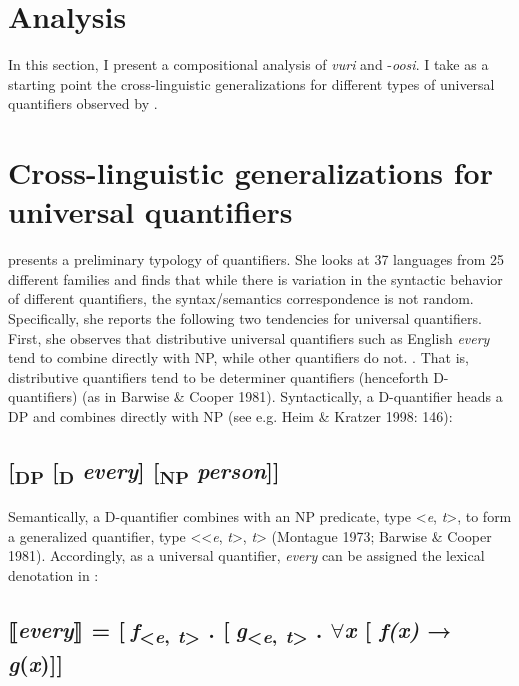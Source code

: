 \documentclass[output=paper]{langsci/langscibook}
\begin{document}
\section{Analysis}

In this section, I present a compositional analysis of \textit{vuri} and -\textit{oosi}. I take as a starting point the cross-linguistic generalizations for different types of universal quantifiers observed by \citet{Matthewson2013}. 

\section{Cross-linguistic generalizations for universal quantifiers}

\citet{Matthewson2013} presents a preliminary typology of quantifiers. She looks at 37 languages from 25 different families and finds that while there is variation in the syntactic behavior of different quantifiers, the syntax/semantics correspondence is not random. Specifically, she reports the following two tendencies for universal quantifiers. First, she observes that distributive universal quantifiers such as English \textit{every} tend to {\textquotedbl}combine directly with NP, while other quantifiers do not.{\textquotedbl} \citep[36]{Matthewson2013}. That is, distributive quantifiers tend to be determiner quantifiers (henceforth D-quantifiers) (as in Barwise \& Cooper 1981). Syntactically, a D-quantifier heads a DP and combines directly with NP (see e.g. Heim \& Kratzer 1998: 146): 

\subsection{      [\textsubscript{DP} [\textsubscript{D} \textit{every}] [\textsubscript{NP} \textit{person}]]}

Semantically, a D-quantifier combines with an NP predicate, type <\textit{e}, \textit{t}>, to form a generalized quantifier, type <<\textit{e}, \textit{t}>, \textit{t}> (Montague 1973; Barwise \& Cooper 1981). Accordingly, as a universal quantifier, \textit{every} can be assigned the lexical denotation in :

\subsection{      ⟦\textit{every}⟧ = [\textit{f}\textsubscript{<}\textit{\textsubscript{e}}\textsubscript{,}\textit{\textsubscript{ t}}\textsubscript{>} . [\textit{g}\textsubscript{<}\textit{\textsubscript{e}}\textsubscript{,}\textit{\textsubscript{ t}}\textsubscript{>} . ${\forall}$\textit{x} [ \textit{f(x)} → \textit{g}(\textit{x})]]}
\end{document}
